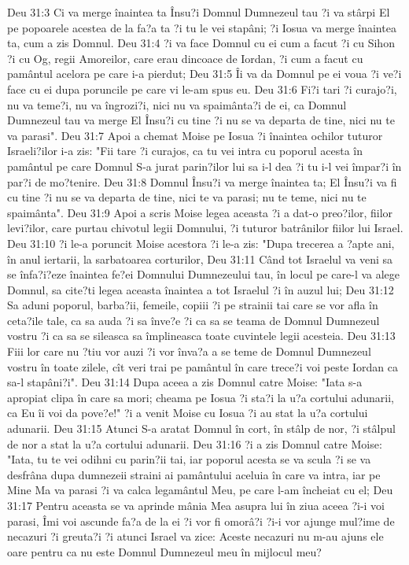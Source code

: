 Deu 31:3  Ci va merge înaintea ta Însu?i Domnul Dumnezeul tau ?i va stârpi El pe popoarele acestea de la fa?a ta ?i tu le vei stapâni; ?i Iosua va merge înaintea ta, cum a zis Domnul.
Deu 31:4  ?i va face Domnul cu ei cum a facut ?i cu Sihon ?i cu Og, regii Amoreilor, care erau dincoace de Iordan, ?i cum a facut cu pamântul acelora pe care i-a pierdut;
Deu 31:5  Îi va da Domnul pe ei voua ?i ve?i face cu ei dupa poruncile pe care vi le-am spus eu.
Deu 31:6  Fi?i tari ?i curajo?i, nu va teme?i, nu va îngrozi?i, nici nu va spaimânta?i de ei, ca Domnul Dumnezeul tau va merge El Însu?i cu tine ?i nu se va departa de tine, nici nu te va parasi".
Deu 31:7  Apoi a chemat Moise pe Iosua ?i înaintea ochilor tuturor Israeli?ilor i-a zis: "Fii tare ?i curajos, ca tu vei intra cu poporul acesta în pamântul pe care Domnul S-a jurat parin?ilor lui sa i-l dea ?i tu i-l vei împar?i în par?i de mo?tenire.
Deu 31:8  Domnul Însu?i va merge înaintea ta; El Însu?i va fi cu tine ?i nu se va departa de tine, nici te va parasi; nu te teme, nici nu te spaimânta".
Deu 31:9  Apoi a scris Moise legea aceasta ?i a dat-o preo?ilor, fiilor levi?ilor, care purtau chivotul legii Domnului, ?i tuturor batrânilor fiilor lui Israel.
Deu 31:10  ?i le-a poruncit Moise acestora ?i le-a zis: "Dupa trecerea a ?apte ani, în anul iertarii, la sarbatoarea corturilor,
Deu 31:11  Când tot Israelul va veni sa se înfa?i?eze înaintea fe?ei Domnului Dumnezeului tau, în locul pe care-l va alege Domnul, sa cite?ti legea aceasta înaintea a tot Israelul ?i în auzul lui;
Deu 31:12  Sa aduni poporul, barba?ii, femeile, copiii ?i pe strainii tai care se vor afla în ceta?ile tale, ca sa auda ?i sa înve?e ?i ca sa se teama de Domnul Dumnezeul vostru ?i ca sa se sileasca sa împlineasca toate cuvintele legii acesteia.
Deu 31:13  Fiii lor care nu ?tiu vor auzi ?i vor înva?a a se teme de Domnul Dumnezeul vostru în toate zilele, cît veri trai pe pamântul în care trece?i voi peste Iordan ca sa-l stapâni?i".
Deu 31:14  Dupa aceea a zis Domnul catre Moise: "Iata s-a apropiat clipa în care sa mori; cheama pe Iosua ?i sta?i la u?a cortului adunarii, ca Eu îi voi da pove?e!" ?i a venit Moise cu Iosua ?i au stat la u?a cortului adunarii.
Deu 31:15  Atunci S-a aratat Domnul în cort, în stâlp de nor, ?i stâlpul de nor a stat la u?a cortului adunarii.
Deu 31:16  ?i a zis Domnul catre Moise: "Iata, tu te vei odihni cu parin?ii tai, iar poporul acesta se va scula ?i se va desfrâna dupa dumnezeii straini ai pamântului aceluia în care va intra, iar pe Mine Ma va parasi ?i va calca legamântul Meu, pe care l-am încheiat cu el;
Deu 31:17  Pentru aceasta se va aprinde mânia Mea asupra lui în ziua aceea ?i-i voi parasi, Îmi voi ascunde fa?a de la ei ?i vor fi omorâ?i ?i-i vor ajunge mul?ime de necazuri ?i greuta?i ?i atunci Israel va zice: Aceste necazuri nu m-au ajuns ele oare pentru ca nu este Domnul Dumnezeul meu în mijlocul meu?
